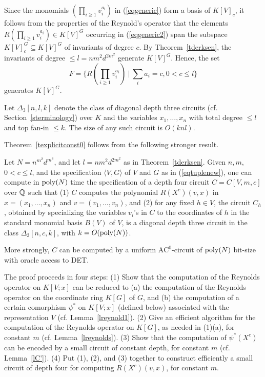 \documentclass[11pt]{article}
\begin{document}
Since the  monomials $(\prod_{i \ge 1} v_i^{a_i})$ in (\ref{eqgeneric}) form a basis of $K[V]_c$, 
it follows from the properties of the Reynold's operator that the elements 
$R(\prod_{i \ge 1} v_i^{a_i}) \in K[V]^G$ occurring in (\ref{eqgeneric2}) span the subspace 
$K[V]^G_c \subseteq K[V]^G$ of invariants of degree $c$. 
By Theorem~\ref{tderksen},  the invariants of degree $\le l=n m^2 d^{2 m^2}$ 
generate $K[V]^G$. Hence,
the set 
\begin{equation} \label{eqF}
 F=\{R(\prod_{i \ge 1} v_i^{a_i}) \ | \ \sum_i a_i =c, 0<c \le l \}
\end{equation}
generates $K[V]^G$. 



Let $\Delta_3[n,l,k]$ denote the class of diagonal depth three circuits  
(cf. Section~\ref{sterminology}) over 
$K$ and  the variables $x_1,\ldots,x_n$ with total degree $\le l$ and top fan-in $\le k$.
The size of any such circuit  is $O(k n l)$. 


Theorem~\ref{texplicitconst0} follows from the following stronger result.


\begin{theorem}  \label{texplicitconst}
Let $N=n^{m^2} d^{m^4}$, and let $l=n m^2 d^{2 m^2}$ as in Theorem~\ref{tderksen}.
Given $n,m$, $0<c\le l$,  and the specification $\langle V, G \rangle$ of $V$ and $G$ as in (\ref{eqtuplenew}),
one can compute in ${\mbox {poly}}(N)$ time the specification of a depth four  
circuit $C=C[V,m,c]$ 
over $\mathbb{Q}$ such that (1) $C$  computes  the polynomial $R(X^c)(v,x)$ in 
$x=(x_1,\ldots,x_n)$ and $v=(v_1,\ldots,v_n)$, and (2)  for  any fixed 
$h \in V$, the circuit $C_h$, obtained by specializing the variables $v_i$'s  in $C$ 
to the coordinates of $h$ in the standard monomial basis $B(V)$ of $V$,  is 
a diagonal depth three circuit in the class $\Delta_3[n,c,k]$, with $k=O({\mbox {poly}}(N))$.

More strongly,  $C$   can be computed by a uniform $\mbox{AC}^0$-circuit of
${\mbox {poly}}(N)$ bit-size with oracle access to DET.
\end{theorem} 

The proof  proceeds in four  steps:
(1) Show that the computation of 
the Reynolds operator on $K[V;x]$ can be reduced to (a) the computation of the Reynolds 
operator on the coordinate ring $K[G]$  of $G$, and (b) the computation of 
a certain  comorphism  $\psi^*$ on $K[V;x]$  (defined below) 
associated with the representation $V$ (cf. Lemma~\ref{lreynold1}). 
(2) Give an efficient
algorithm for the computation of  the Reynolds operator on $K[G]$, as needed in (1)(a), 
for constant $m$ 
(cf. Lemma~\ref{lreynolds}). 
(3) Show that  the computation of $\psi^*(X^c)$
can be encoded by a small  circuit of constant depth, for constant
$m$ (cf. Lemma~\ref{lC'}).
(4) Put  (1), (2), and (3) together  to  construct efficiently a small circuit of  depth four
for computing $R(X^c)(v,x)$, for constant $m$. 
\end{document}
